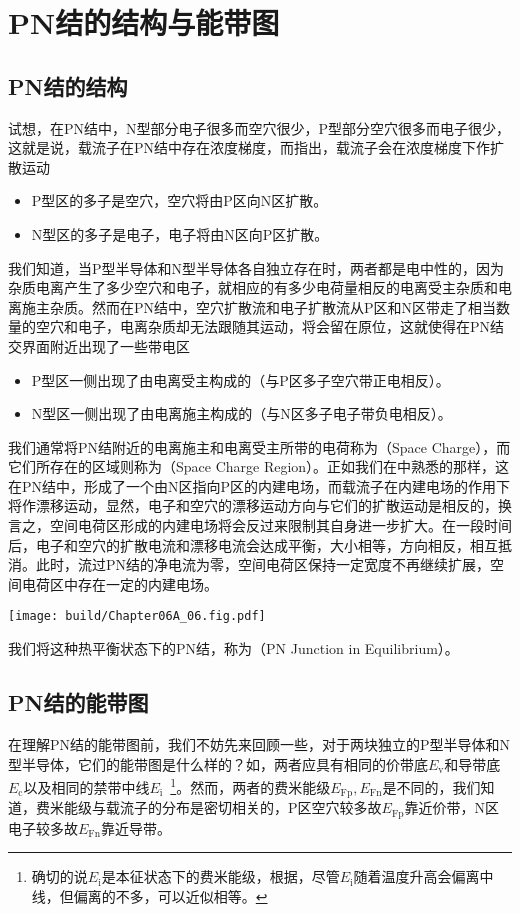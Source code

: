 \section{PN结的结构与能带图}\nopagebreak

\subsection{PN结的结构}
试想，在PN结中，N型部分电子很多而空穴很少，P型部分空穴很多而电子很少，这就是说，载流子在PN结中存在浓度梯度，而指出，载流子会在浓度梯度下作扩散运动
\begin{itemize}
    \item P型区的多子是空穴，空穴将由P区向N区扩散。
    \item N型区的多子是电子，电子将由N区向P区扩散。
\end{itemize}
我们知道，当P型半导体和N型半导体各自独立存在时，两者都是电中性的，因为杂质电离产生了多少空穴和电子，就相应的有多少电荷量相反的电离受主杂质和电离施主杂质。然而在PN结中，空穴扩散流和电子扩散流从P区和N区带走了相当数量的空穴和电子，电离杂质却无法跟随其运动，将会留在原位，这就使得在PN结交界面附近出现了一些带电区
\begin{itemize}
    \item P型区一侧出现了由电离受主构成的（与P区多子空穴带正电相反）。
    \item N型区一侧出现了由电离施主构成的（与N区多子电子带负电相反）。
\end{itemize}
我们通常将PN结附近的电离施主和电离受主所带的电荷称为（Space Charge），而它们所存在的区域则称为（Space Charge Region）。正如我们在中熟悉的那样，这在PN结中，形成了一个由N区指向P区的内建电场，而载流子在内建电场的作用下将作漂移运动，显然，电子和空穴的漂移运动方向与它们的扩散运动是相反的，换言之，空间电荷区形成的内建电场将会反过来限制其自身进一步扩大。在一段时间后，电子和空穴的扩散电流和漂移电流会达成平衡，大小相等，方向相反，相互抵消。此时，流过PN结的净电流为零，空间电荷区保持一定宽度不再继续扩展，空间电荷区中存在一定的内建电场。

\begin{Figure}[PN结的空间电荷区]
    \texttt{[image: build/Chapter06A\_06.fig.pdf]}
\end{Figure}

我们将这种热平衡状态下的PN结，称为（PN Junction in Equilibrium）。


\subsection{PN结的能带图}
在理解PN结的能带图前，我们不妨先来回顾一些，对于两块独立的P型半导体和N型半导体，它们的能带图是什么样的？如，两者应具有相同的价带底$E_\text{v}$和导带底$E_\text{c}$以及相同的禁带中线$E_\text{i}$\ \footnote{确切的说$E_\text{i}$是本征状态下的费米能级，根据，尽管$E_\text{i}$随着温度升高会偏离中线，但偏离的不多，可以近似相等。}。然而，两者的费米能级$E_\text{Fp},E_\text{Fn}$是不同的，我们知道，费米能级与载流子的分布是密切相关的，P区空穴较多故$E_\text{Fp}$靠近价带，N区电子较多故$E_\text{Fn}$靠近导带。

